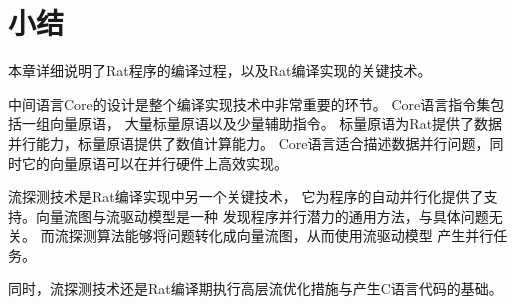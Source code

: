 \section{小结}
本章详细说明了Rat程序的编译过程，以及Rat编译实现的关键技术。

中间语言Core的设计是整个编译实现技术中非常重要的环节。
Core语言指令集包括一组向量原语，
大量标量原语以及少量辅助指令。
标量原语为Rat提供了数据并行能力，标量原语提供了数值计算能力。
Core语言适合描述数据并行问题，同时它的向量原语可以在并行硬件上高效实现。

流探测技术是Rat编译实现中另一个关键技术，
它为程序的自动并行化提供了支持。向量流图与流驱动模型是一种
发现程序并行潜力的通用方法，与具体问题无关。
而流探测算法能够将问题转化成向量流图，从而使用流驱动模型
产生并行任务。

同时，流探测技术还是Rat编译期执行高层流优化措施与产生C语言代码的基础。

